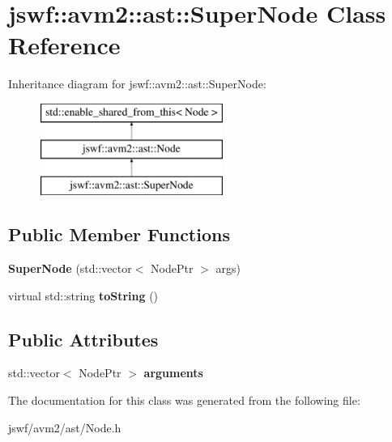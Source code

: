 \hypertarget{classjswf_1_1avm2_1_1ast_1_1_super_node}{\section{jswf\+:\+:avm2\+:\+:ast\+:\+:Super\+Node Class Reference}
\label{classjswf_1_1avm2_1_1ast_1_1_super_node}
}
Inheritance diagram for jswf\+:\+:avm2\+:\+:ast\+:\+:Super\+Node\+:\begin{figure}[H]
\begin{center}
\leavevmode
\includegraphics[height=3.000000cm]{classjswf_1_1avm2_1_1ast_1_1_super_node}
\end{center}
\end{figure}
\subsection*{Public Member Functions}
\begin{DoxyCompactItemize}
\item 
\hypertarget{classjswf_1_1avm2_1_1ast_1_1_super_node_a6ed2d6ab8b5599235fbe2097cfa25d0b}{{\bfseries Super\+Node} (std\+::vector$<$ Node\+Ptr $>$ args)}\label{classjswf_1_1avm2_1_1ast_1_1_super_node_a6ed2d6ab8b5599235fbe2097cfa25d0b}

\item 
\hypertarget{classjswf_1_1avm2_1_1ast_1_1_super_node_a3cddd13ede562668049043693583de07}{virtual std\+::string {\bfseries to\+String} ()}\label{classjswf_1_1avm2_1_1ast_1_1_super_node_a3cddd13ede562668049043693583de07}

\end{DoxyCompactItemize}
\subsection*{Public Attributes}
\begin{DoxyCompactItemize}
\item 
\hypertarget{classjswf_1_1avm2_1_1ast_1_1_super_node_acd35b583cc788defc7b4cb9283b7185b}{std\+::vector$<$ Node\+Ptr $>$ {\bfseries arguments}}\label{classjswf_1_1avm2_1_1ast_1_1_super_node_acd35b583cc788defc7b4cb9283b7185b}

\end{DoxyCompactItemize}


The documentation for this class was generated from the following file\+:\begin{DoxyCompactItemize}
\item 
jswf/avm2/ast/Node.\+h\end{DoxyCompactItemize}
